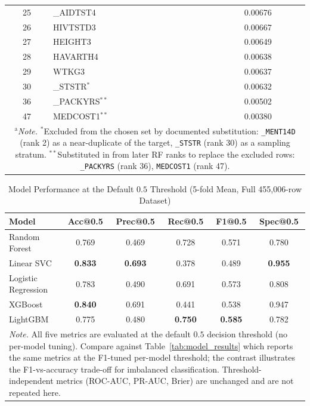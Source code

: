 \documentclass[conference]{IEEEtran}
\begin{document}
\begin{table}[H]
\begin{tabular}{|c|l|c|}
25 & \_AIDTST4  & 0.00676 \\
26 & HIVTSTD3   & 0.00667 \\
27 & HEIGHT3    & 0.00649 \\
28 & HAVARTH4   & 0.00638 \\
29 & WTKG3      & 0.00637 \\
30 & \_STSTR$^{*}$    & 0.00632 \\
36 & \_PACKYRS$^{**}$  & 0.00502 \\
47 & MEDCOST1$^{**}$   & 0.00380 \\
\hline
\multicolumn{3}{|p{8cm}|}{\footnotesize $^{\mathrm{a}}$\textit{Note.} $^{*}$Excluded from the chosen set by documented substitution: \texttt{\_MENT14D} (rank 2) as a near-duplicate of the target, \texttt{\_STSTR} (rank 30) as a sampling stratum. $^{**}$Substituted in from later RF ranks to replace the excluded rows: \texttt{\_PACKYRS} (rank 36), \texttt{MEDCOST1} (rank 47).} \\
\hline
\end{tabular}
\end{table}

\begin{table}[!t]
\caption{Model Performance at the Default $0.5$ Threshold (5-fold Mean, Full 455,006-row Dataset)}
\label{tab:metrics_at_0_5}
\centering
\scriptsize
\setlength{\tabcolsep}{4pt}
\renewcommand{\arraystretch}{1.15}
\begin{tabular}{|l|c|c|c|c|c|}
\hline
\textbf{Model} & \textbf{Acc@0.5} & \textbf{Prec@0.5} & \textbf{Rec@0.5} & \textbf{F1@0.5} & \textbf{Spec@0.5} \\
\hline
Random Forest       & 0.769 & 0.469 & 0.728 & 0.571 & 0.780 \\
\hline
Linear SVC          & \textbf{0.833} & \textbf{0.693} & 0.378 & 0.489 & \textbf{0.955} \\
\hline
Logistic Regression & 0.783 & 0.490 & 0.691 & 0.573 & 0.808 \\
\hline
XGBoost             & \textbf{0.840} & 0.691 & 0.441 & 0.538 & 0.947 \\
\hline
LightGBM            & 0.775 & 0.480 & \textbf{0.750} & \textbf{0.585} & 0.782 \\
\hline
\multicolumn{6}{|p{8cm}|}{\footnotesize \textit{Note.} All five metrics are evaluated at the default $0.5$ decision threshold (no per-model tuning). Compare against Table~\ref{tab:model_results} which reports the same metrics at the F1-tuned per-model threshold; the contrast illustrates the F1-vs-accuracy trade-off for imbalanced classification. Threshold-independent metrics (ROC-AUC, PR-AUC, Brier) are unchanged and are not repeated here.} \\
\hline
\end{tabular}
\end{table}

 
 

\vspace{12pt}
\end{document}
